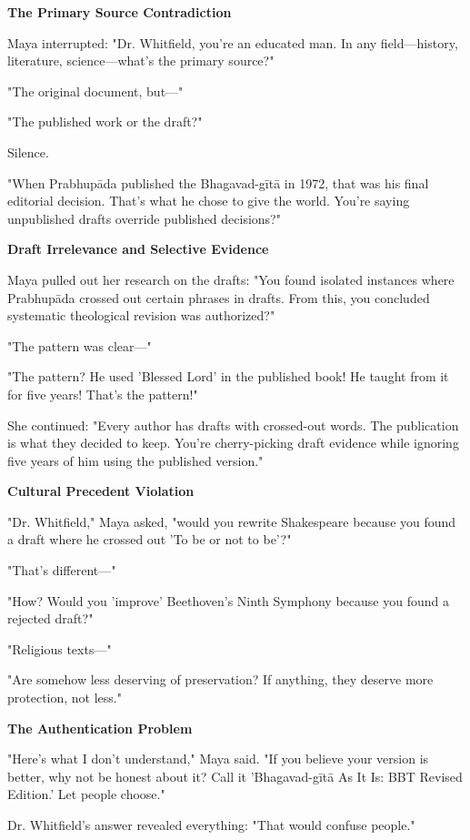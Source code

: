 \documentclass[11pt,twoside]{book}
\begin{document}
\begin{itemize}
\textbf{\textbf{The Primary Source Contradiction}}

Maya interrupted: "Dr. Whitfield, you're an educated man. In any field—history, literature, science—what's the primary source?"

"The original document, but—"

"The published work or the draft?"

Silence.

"When Prabhupāda published the Bhagavad-gītā in 1972, that was his final editorial decision. That's what he chose to give the world. You're saying unpublished drafts override published decisions?"

\textbf{\textbf{\textbf{Draft Irrelevance and Selective Evidence}}}

Maya pulled out her research on the drafts: "You found isolated instances where Prabhupāda crossed out certain phrases in drafts. From this, you concluded systematic theological revision was authorized?"

"The pattern was clear—"

"The pattern? He used 'Blessed Lord' in the published book! He taught from it for five years! That's the pattern!"

She continued: "Every author has drafts with crossed-out words. The publication is what they decided to keep. You're cherry-picking draft evidence while ignoring five years of him using the published version."

\textbf{\textbf{\textbf{Cultural Precedent Violation}}}

"Dr. Whitfield," Maya asked, "would you rewrite Shakespeare because you found a draft where he crossed out 'To be or not to be'?"

"That's different—"

"How? Would you 'improve' Beethoven's Ninth Symphony because you found a rejected draft?"

"Religious texts—"

"Are somehow less deserving of preservation? If anything, they deserve more protection, not less."

\textbf{\textbf{\textbf{The Authentication Problem}}}

"Here's what I don't understand," Maya said. "If you believe your version is better, why not be honest about it? Call it 'Bhagavad-gītā As It Is: BBT Revised Edition.' Let people choose."

Dr. Whitfield's answer revealed everything: "That would confuse people."


\end{itemize}
\end{document}

